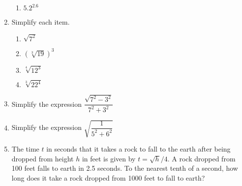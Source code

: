 \documentclass[12pt]{article}
\begin{document}
\begin{enumerate}
\begin{multicols}{2}
\begin{enumerate}
	\item \hspace{0.50in} $5.2^{2.6}$
	\spacing

	\end{enumerate}
	\end{multicols}
	\spacing

\item Simplify each item. 
	\begin{multicols}{2}
	\begin{enumerate}
	\item \hspace{0.50in} $\sqrt{7^2}$
	\spacing

	\item \hspace{0.50in} $(\sqrt[3]{19})^3$
  	\spacing

	\item \hspace{0.50in} $\sqrt[4]{12^3}$
  	\spacing

	\item \hspace{0.50in} $\sqrt[3]{22^4}$
  	\spacing

	\end{enumerate}
	\end{multicols}
	\spacing

\item Simplify the expression $\dfrac{\sqrt{7^2-3^2}}{7^2+3^2}$ 
	\spacing

\item Simplify the expression $\sqrt{\dfrac{1}{5^2+6^2}}$ 
	\spacing

\item The time $t$ in seconds that it takes a rock to fall to the earth after being dropped from height $h$ in feet is given by $t=\sqrt{h}/4$. A rock dropped from 100 feet falls to earth in 2.5 seconds. To the nearest tenth of a second, how long does it take a rock dropped from 1000 feet to fall to earth? 
	\spacing

\end{enumerate}
\end{document}

